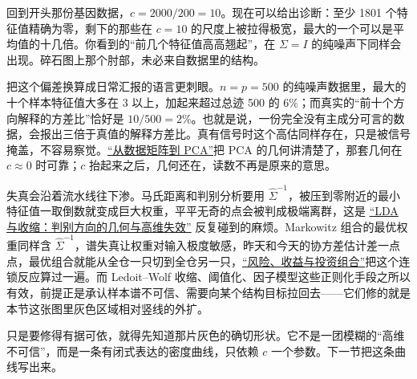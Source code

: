 回到开头那份基因数据，\(c=2000/200=10\)。现在可以给出诊断：至少 1801 个特征值精确为零，剩下的那些在 \(c=10\) 的尺度上被拉得极宽，最大的一个可以是平均值的十几倍。你看到的``前几个特征值高高翘起''，在 \(\Sigma=I\) 的纯噪声下同样会出现。碎石图上那个肘部，未必来自数据里的结构。

把这个偏差换算成日常汇报的语言更刺眼。\(n=p=500\) 的纯噪声数据里，最大的十个样本特征值大多在 3 以上，加起来超过总迹 500 的 \(6\%\)；而真实的``前十个方向解释的方差比''恰好是 \(10/500=2\%\)。也就是说，一份完全没有主成分可言的数据，会报出三倍于真值的解释方差比。真有信号时这个高估同样存在，只是被信号掩盖，不容易察觉。\hyperref[sec:03-Linear-Algebra/07-SVD-and-Data-Applications/04]{``从数据矩阵到 PCA''}把 PCA 的几何讲清楚了，那套几何在 \(c\approx0\) 时可靠；\(c\) 抬起来之后，几何还在，读数不再是原来的意思。

失真会沿着流水线往下渗。马氏距离和判别分析要用 \(\widehat\Sigma^{-1}\)，被压到零附近的最小特征值一取倒数就变成巨大权重，平平无奇的点会被判成极端离群，这是 \hyperref[sec:13-Machine-Learning/06-Probabilistic-Models/02]{``LDA 与收缩：判别方向的几何与高维失效''} 反复碰到的麻烦。Markowitz 组合的最优权重同样含 \(\widehat\Sigma^{-1}\)，谱失真让权重对输入极度敏感，昨天和今天的协方差估计差一点点，最优组合就能从全仓一只切到全仓另一只，\hyperref[sec:09-Convex-Optimization/07-Applications/04]{``风险、收益与投资组合''}把这个连锁反应算过一遍。而 Ledoit--Wolf 收缩、阈值化、因子模型这些正则化手段之所以有效，前提正是承认样本谱不可信、需要向某个结构目标拉回去——它们修的就是本节这张图里灰色区域相对竖线的外扩。

只是要修得有据可依，就得先知道那片灰色的确切形状。它不是一团模糊的``高维不可信''，而是一条有闭式表达的密度曲线，只依赖 \(c\) 一个参数。下一节把这条曲线写出来。

